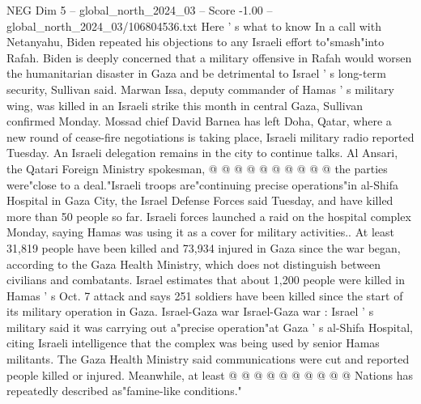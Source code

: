 \begin{textsample}{NEG Dim 5 – global\_north\_2024\_03 – Score -1.00 – global\_north\_2024\_03/106804536.txt}
Here ' s what to know In a call with Netanyahu, Biden repeated his objections to any Israeli effort to"smash"into Rafah.
Biden is deeply concerned that a military offensive in Rafah would worsen the humanitarian disaster in Gaza and be detrimental to Israel ' s long-term security, Sullivan said.
Marwan Issa, deputy commander of Hamas ' s military wing, was killed in an Israeli strike this month in central Gaza, Sullivan confirmed Monday.
Mossad chief David Barnea has left Doha, Qatar, where a new round of cease-fire negotiations is taking place, Israeli military radio reported Tuesday.
An Israeli delegation remains in the city to continue talks.
Al Ansari, the Qatari Foreign Ministry spokesman, @ @ @ @ @ @ @ @ @ @ the parties were"close to a deal."Israeli troops are"continuing precise operations"in al-Shifa Hospital in Gaza City, the Israel Defense Forces said Tuesday, and have killed more than 50 people so far.
Israeli forces launched a raid on the hospital complex Monday, saying Hamas was using it as a cover for military activities..
At least 31,819 people have been killed and 73,934 injured in Gaza since the war began, according to the Gaza Health Ministry, which does not distinguish between civilians and combatants.
Israel estimates that about 1,200 people were killed in Hamas ' s Oct. 7 attack and says 251 soldiers have been killed since the start of its military operation in Gaza.
Israel-Gaza war Israel-Gaza war : Israel ' s military said it was carrying out a"precise operation"at Gaza ' s al-Shifa Hospital, citing Israeli intelligence that the complex was being used by senior Hamas militants.
The Gaza Health Ministry said communications were cut and reported people killed or injured.
Meanwhile, at least @ @ @ @ @ @ @ @ @ @ Nations has repeatedly described as"famine-like conditions."

\end{textsample}
